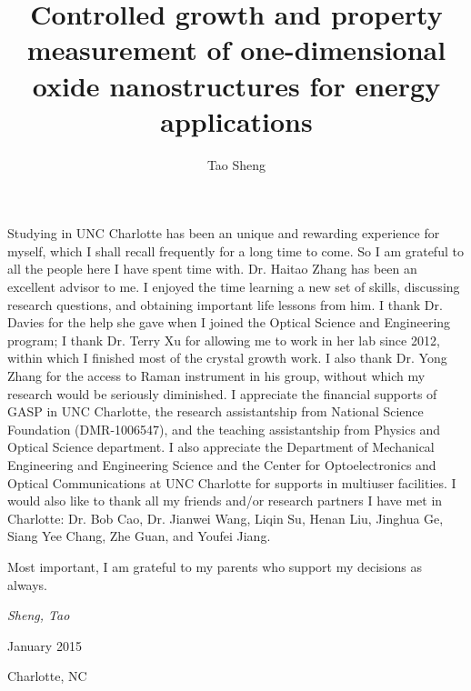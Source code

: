   \title{Controlled growth and property measurement of one-dimensional oxide nanostructures for energy applications}
  \author{Tao Sheng}
  \thesisyear{\the\year}



\maketitle



\begin{ackn}
Studying in UNC Charlotte has been an unique and rewarding experience for myself, which I shall recall frequently for a long time to come. So I am grateful to all the people here I have spent time with. Dr. Haitao Zhang has been an excellent advisor to me. I enjoyed the time learning a new set of skills, discussing research questions, and obtaining important life lessons from him. I thank Dr. Davies for the help she gave when I joined the Optical Science and Engineering program; I thank Dr. Terry Xu for allowing me to work in her lab since 2012, within which I finished most of the crystal growth work. I also thank Dr. Yong Zhang for the access to Raman instrument in his group, without which my research would be seriously diminished. I appreciate the financial supports of GASP in UNC Charlotte, the research assistantship from National Science Foundation (DMR-1006547), and the teaching assistantship from Physics and Optical Science department. I also appreciate the Department of Mechanical Engineering and Engineering Science and the Center for Optoelectronics and Optical Communications at UNC Charlotte for supports in multiuser facilities. I would also like to thank all my friends and/or research partners I have met in Charlotte: Dr. Bob Cao, Dr. Jianwei Wang, Liqin Su, Henan Liu, Jinghua Ge, Siang Yee Chang, Zhe Guan, and Youfei Jiang. 

Most important, I am grateful to my parents who support my decisions as always. 


\begin{minipage}[b]{0.95\textwidth}

\begin{flushright}
\vspace{2in}
\emph{Sheng, Tao}

January 2015

Charlotte, NC

\end{flushright}
\end{minipage}
\end{ackn}

